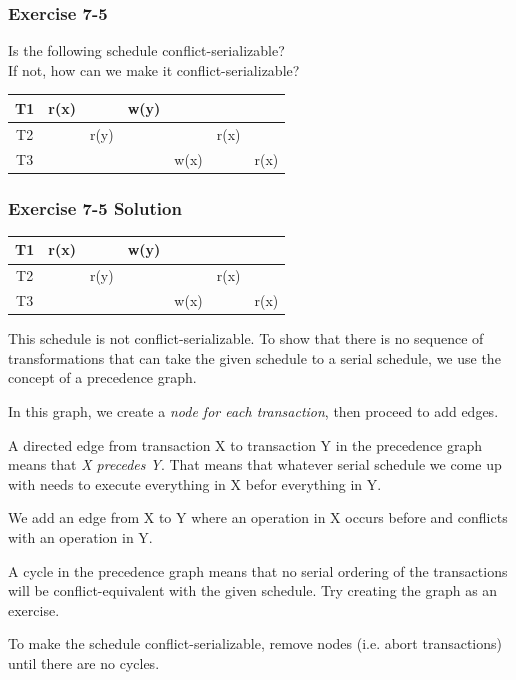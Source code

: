 \begin{frame}
\frametitle{Exercise 7-5}

Is the following schedule conflict-serializable? \\
If not, how can we make it conflict-serializable?

\begin{center}
\begin{tabular}{ c c c c c c c }
  \hline
  T1 & r(x) & & w(y) & & & \\
  \hline
  T2 & & r(y) & & & r(x) & \\
  \hline
  T3 & & & & w(x) & & r(x) \\
  \hline
\end{tabular}
\end{center}

\end{frame}


\begin{frame}
\frametitle{Exercise 7-5 Solution}

\begin{center}
\begin{tabular}{ c c c c c c c }
  \hline
  T1 & r(x) & & w(y) & & & \\
  \hline
  T2 & & r(y) & & & r(x) & \\
  \hline
  T3 & & & & w(x) & & r(x) \\
  \hline
\end{tabular}
\end{center}

This schedule is not conflict-serializable. To show that there is no sequence of transformations that can take the given schedule to a serial schedule, we use the concept of a precedence graph.

In this graph, we create a \textit{node for each transaction}, then proceed to add edges.

A directed edge from transaction X to transaction Y in the precedence graph means that \textit{X precedes Y}. That means that whatever serial schedule we come up with needs to execute everything in X befor everything in Y.

We add an edge from X to Y where an operation in X occurs before and conflicts with an operation in Y.

A cycle in the precedence graph means that no serial ordering of the transactions will be conflict-equivalent with the given schedule. Try creating the graph as an exercise.

To make the schedule conflict-serializable, remove nodes (i.e. abort transactions) until there are no cycles.

\end{frame}

